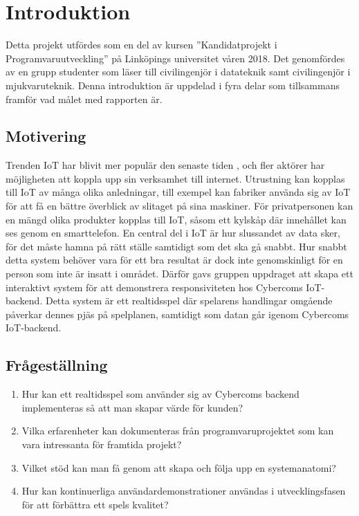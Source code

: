 \chapter{Introduktion}
\label{cha:introduction}
Detta projekt utfördes som en del av kursen ''Kandidatprojekt i Programvaruutveckling'' på Linköpings universitet våren 2018. Det genomfördes av en grupp studenter som läser till civilingenjör i datateknik samt civilingenjör i mjukvaruteknik.
Denna introduktion är uppdelad i fyra delar som tillsammans framför vad målet med rapporten är.

\section{Motivering}
\label{sec:motivation}
Trenden IoT har blivit mer populär den senaste tiden \cite{IoT-ecosystem}, och fler aktörer har möjligheten att koppla upp sin verksamhet till internet. Utrustning kan kopplas till IoT av många olika anledningar, till exempel kan fabriker använda sig av IoT för att få en bättre överblick av slitaget på sina maskiner. För privatpersonen kan en mängd olika produkter kopplas till IoT, såsom ett kylskåp där innehållet kan ses genom en smarttelefon. En central del i IoT är hur slussandet av data sker, för det måste hamna på rätt ställe samtidigt som det ska gå snabbt. Hur snabbt detta system behöver vara för ett bra resultat är dock inte genomskinligt för en person som inte är insatt i området. Därför gavs gruppen uppdraget att skapa ett interaktivt system för att demonstrera responsiviteten hos Cybercoms IoT-backend. Detta system är ett realtidsspel där spelarens handlingar omgående påverkar dennes pjäs på spelplanen, samtidigt som datan går igenom Cybercoms IoT-backend.


\section{Frågeställning}

\begin{enumerate}
	\item \label{fs:fs_1} Hur kan ett realtidsspel som använder sig av Cybercoms backend implementeras så att man skapar värde för kunden?
	\item \label{fs:fs_2} Vilka erfarenheter kan dokumenteras från programvaruprojektet som kan vara intressanta för framtida projekt?
	\item \label{fs:fs_3} Vilket stöd kan man få genom att skapa och följa upp en systemanatomi?
	\item \label{fs:fs_4} Hur kan kontinuerliga användardemonstrationer användas i utvecklingsfasen för att förbättra ett spels kvalitet?

\end{enumerate}

